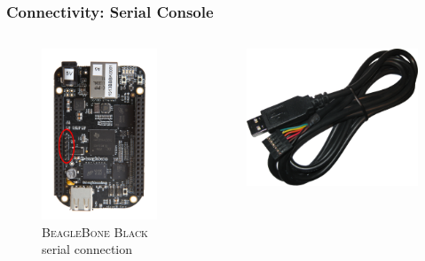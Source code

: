 \documentclass[aspectratio=169]{beamer}
\begin{document}
\begin{frame}
  \frametitle{Connectivity: Serial Console}
  \begin{columns}
    \begin{figure}
      \centering
      \includegraphics[scale=0.5]{images/bbb-serial.png}
      \caption{\textsc{BeagleBone Black} serial connection}
    \end{figure}
    \begin{figure}
      \centering
      \includegraphics[scale=0.3]{images/ftdi-cable.png}

\end{figure}
\end{columns}
\end{frame}
\end{document}
